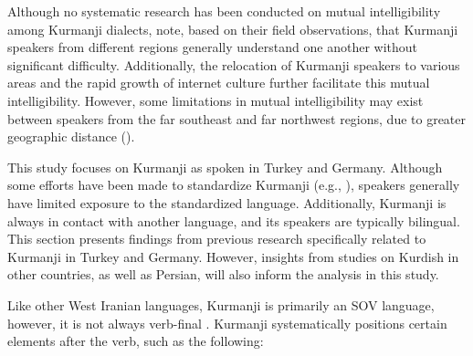 Although no systematic research has been conducted on mutual intelligibility among Kurmanji dialects, \citet{OpenginHaig2014} note, based on their field observations, that Kurmanji speakers from different regions generally understand one another without significant difficulty. Additionally, the relocation of Kurmanji speakers to various areas and the rapid growth of internet culture further facilitate this mutual intelligibility. However, some limitations in mutual intelligibility may exist between speakers from the far southeast and far northwest regions, due to greater geographic distance (\citealt{OpenginHaig2014}).

This study focuses on Kurmanji as spoken in Turkey and Germany. Although some efforts have been made to standardize Kurmanji (e.g., \citealt{KhanLescot1970}), speakers generally have limited exposure to the standardized language. Additionally, Kurmanji is always in contact with another language, and its speakers are typically bilingual. This section presents findings from previous research specifically related to Kurmanji in Turkey and Germany. However, insights from studies on Kurdish in other countries, as well as Persian, will also inform the analysis in this study.

Like other West Iranian languages, Kurmanji is primarily an SOV language, however, it is not always verb-final \citep{Haig2014}. Kurmanji systematically positions certain elements after the verb, such as the following:

